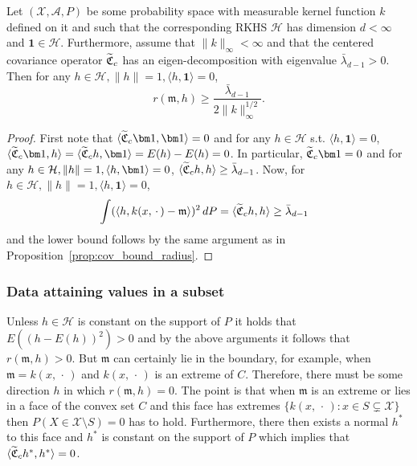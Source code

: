 \documentclass[AHL,Unicode,longabstracts,published]{cedram}
\theoremstyle{remark}
\newcommand{\X}{\mathcal{X}}
\newcommand{\clA}{\mathcal{A}}
\newcommand{\cH}{\mathcal{H}}
\newcommand{\fkC}{\mathfrak{C}}
\newcommand{\mean}{\mathfrak{m}}
\let\oldtilde\tilde
\renewcommand*{\tilde}[1]{\mathchoice{\widetilde{#1}}{\widetilde{#1}}{\oldtilde{#1}}{\oldtilde{#1}}}
\begin{document}
\begin{coro}\label{cor:cov_constant_inH}
Let $(\X,\clA,P)$ be some probability space with measurable kernel function $k$ defined on it and such that the corresponding RKHS $\cH$ has dimension $d<\infty$ and $\bm 1 \in \cH$. Furthermore, assume that $\|k\|_\infty < \infty$ and that the centered covariance operator $\tilde{\fkC}_c$ has an eigen-decomposition with eigenvalue $\bar \lambda_{d-1} > 0$. Then for any $h\in \cH, \|h\| =1, \langle h, \bm 1 \rangle = 0$,
\[
r(\mean,h) \geq \frac{\bar \lambda_{d-1}}{2\|k\|_\infty^{1/2}}.
\]
\end{coro}
\goodbreak
\begin{proof}
First note that $\langle \tilde{\fkC}_c \bm 1, \bm 1 \rangle = 0$ and for any $h \in \cH$ s.t. $\langle h, \bm 1 \rangle =0 $, $\langle \tilde{\fkC}_c \bm 1, h \rangle =\langle \tilde{\fkC}_c h, \bm 1 \rangle = E(h) - E(h) = 0$. In particular, $\tilde{\fkC}_c \bm 1 = 0$ and for any $h \in \cH, \|h\| =1,\linebreak \langle h, \bm 1 \rangle = 0$, $\langle \tilde{\fkC}_c h, h \rangle \geq \bar \lambda_{d-1}$. Now, for $h\in \cH, \|h\|=1, \langle h, \bm 1\rangle =0 $,
\begin{align*}
&\int (\langle h, k(x,\,\cdot\,) - \mean \rangle)^2 \, dP = \langle \tilde{\fkC}_c h, h \rangle \geq \bar \lambda_{d-1}
\end{align*}
and the lower bound follows by the same argument as in Proposition~\ref{prop:cov_bound_radius}.
\end{proof}

\subsubsection{Data attaining values in a subset} \label{sec:data_subset_covariance_arg}
Unless $h \in \cH$ is constant on the support of $P$ it holds that $E((h - E(h))^2) > 0 $ and by the above arguments it follows that $r(\mean,h) > 0$. But $\mean$ can certainly lie in the boundary, for example, when $\mean = k(x,\,\cdot\,)$ and $k(x,\,\cdot\,)$ is an extreme of $C$. Therefore, there must be some direction $h$ in which $r(\mean,h) = 0$. The point is that when $\mean$ is an extreme or lies in a face of the convex set $C$ and this face has extremes $\{ k(x, \,\cdot\,) : x \in S \subsetneq \X \}$ then $P(X \in \X \setminus S)= 0$ has to hold. Furthermore, there then exists a normal $h^*$ to this face and $h^*$ is constant on the support of $P$ which implies that $\langle \tilde{\fkC}_c h^*, h^* \rangle = 0$.
\end{document}
